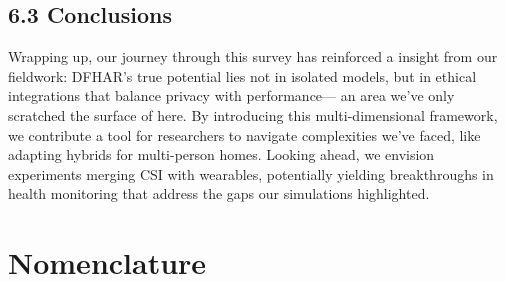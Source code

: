 \documentclass[Afour,sageh,times]{sagej}
\begin{document}
\subsection{6.3 Conclusions}
\label{subsec:conclusions}

Wrapping up, our journey through this survey has reinforced a insight from our fieldwork: DFHAR's true potential lies not in isolated models, but in ethical integrations that balance privacy with performance— an area we've only scratched the surface of here. By introducing this multi-dimensional framework, we contribute a tool for researchers to navigate complexities we've faced, like adapting hybrids for multi-person homes. Looking ahead, we envision experiments merging CSI with wearables, potentially yielding breakthroughs in health monitoring that address the gaps our simulations highlighted.



\section*{Nomenclature}\label{nomenclature} 
\end{document}
